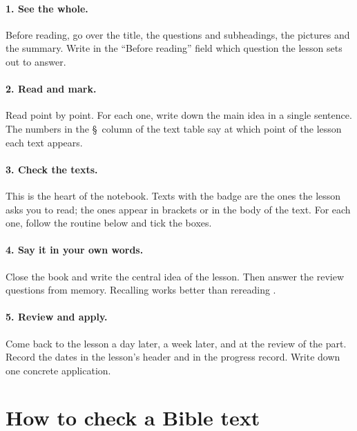 \paragraph{1. See the whole.} Before reading, go over the title, the questions
and subheadings, the pictures and the summary. Write in the \enquote{Before
reading} field which question the lesson sets out to answer.

\paragraph{2. Read and mark.} Read point by point. For each one, write down
the main idea in a single sentence. The numbers in the \S\ column of the text
table say at which point of the lesson each text appears.

\paragraph{3. Check the texts.} This is the heart of the notebook. Texts with
the  badge are the ones the lesson asks you to read; the
 ones appear in brackets or in the body of the text. For
each one, follow the routine below and tick the boxes.

\paragraph{4. Say it in your own words.} Close the book and write the central
idea of the lesson. Then answer the review questions from memory. Recalling
works better than rereading \parencite{brown2014}.

\paragraph{5. Review and apply.} Come back to the lesson a day later, a week
later, and at the review of the part. Record the dates in the lesson's header
and in the progress record. Write down one concrete application.

\section{How to check a Bible text}

